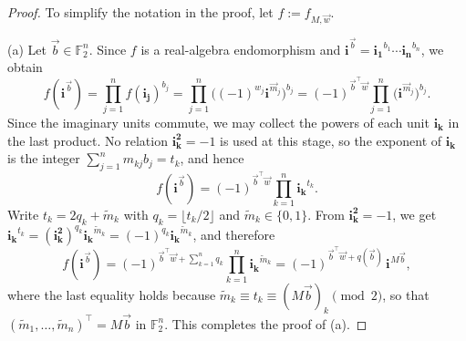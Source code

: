 \documentclass[12pt]{amsart}
\theoremstyle{plain}
\theoremstyle{definition}
\numberwithin{equation}{section}
\newcommand{\im}[1]{\mathbf{ i_{#1}}}
\newcommand{\ims}[1]{\mathbf{ i_{#1}^2}}
\begin{document}
    \begin{proof}
    To simplify the notation in the proof, let $f := f_{M,\vec w}$. 

    (a) Let $\vec{b} \in \mathbb{F}_2^n$. Since $f$ is a real-algebra
endomorphism and $\im{}^{\vec{b}} = \im{1}^{b_1} \cdots \im{n}^{b_n}$,
we obtain
    \[
        f(\im{}^{\vec{b}})
        = \prod_{j=1}^n f(\im{j})^{b_j}
        = \prod_{j=1}^n \big( (-1)^{w_j} \im{}^{\vec{m}_j} \big)^{b_j}
        = (-1)^{\vec{b}^\top \vec{w}} \prod_{j=1}^n
          \big( \im{}^{\vec{m}_j} \big)^{b_j}.
    \]
Since the imaginary units commute, we may collect the powers of each
unit $\im{k}$ in the last product. No relation $\ims{k} = -1$ is used
at this stage, so the exponent of $\im{k}$ is the integer
$\sum_{j=1}^n m_{kj} b_j = t_k$, and hence
    \[
        f(\im{}^{\vec{b}})
        = (-1)^{\vec{b}^\top \vec{w}} \prod_{k=1}^n \im{k}^{t_k}.
    \]
Write $t_k = 2 q_k + \tilde{m}_k$ with $q_k = \lfloor t_k / 2 \rfloor$
and $\tilde{m}_k \in \{0, 1\}$. From $\ims{k} = -1$, we get
$\im{k}^{t_k} = (\ims{k})^{q_k} \im{k}^{\tilde{m}_k}
= (-1)^{q_k} \im{k}^{\tilde{m}_k}$, and therefore
    \[
        f(\im{}^{\vec{b}})
        = (-1)^{\vec{b}^\top \vec{w} + \sum_{k=1}^n q_k}
          \prod_{k=1}^n \im{k}^{\tilde{m}_k}
        = (-1)^{\vec{b}^\top \vec{w} + q(\vec{b})}\, \im{}^{M \vec{b}},
    \]
where the last equality holds because
$\tilde{m}_k \equiv t_k \equiv (M\vec{b})_k \pmod{2}$, so that
$(\tilde{m}_1, \ldots, \tilde{m}_n)^\top = M\vec{b}$ in
$\mathbb{F}_2^n$. This completes the proof of (a).


\end{proof}
\end{document}
